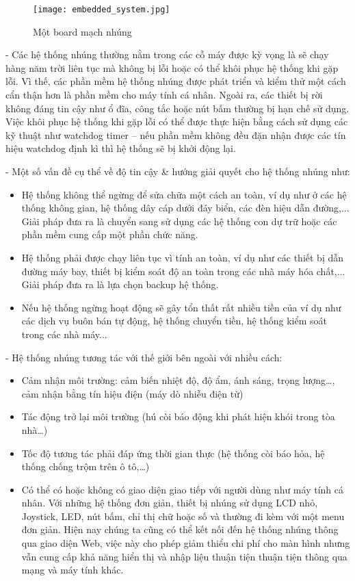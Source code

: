 \begin{figure}[H]
	\centering
	\texttt{[image: embedded\_system.jpg]}
	\caption{Một board mạch nhúng}
\end{figure}

	- Các hệ thống nhúng thường nằm trong các cỗ máy được kỳ vọng là sẽ chạy hàng năm trời liên tục mà không bị lỗi hoặc có thể khôi phục hệ thống khi gặp lỗi. Vì thế, các phần mềm hệ thống nhúng được phát triển và kiểm thử một cách cẩn thận hơn là phần mềm cho máy tính cá nhân. Ngoài ra, các thiết bị rời không đáng tin cậy như ổ đĩa, công tắc hoặc nút bấm thường bị hạn chế sử dụng. Việc khôi phục hệ thống khi gặp lỗi có thể được thực hiện bằng cách sử dụng các kỹ thuật như watchdog timer – nếu phần mềm không đều đặn nhận được các tín hiệu watchdog định kì thì hệ thống sẽ bị khởi động lại.
	
	- Một số vấn đề cụ thể về độ tin cậy \& hướng giải quyết cho hệ thống nhúng như:
\begin{itemize}[leftmargin=2.2cm]
		\item Hệ thống không thể ngừng để sửa chữa một cách an toàn, ví dụ như ở các hệ thống không gian, hệ thống dây cáp dưới đáy biển, các đèn hiệu dẫn đường,... Giải pháp đưa ra là chuyển sang sử dụng các hệ thống con dự trữ hoặc các phần mềm cung cấp một phần chức năng.
		
		\item Hệ thống phải được chạy liên tục vì tính an toàn, ví dụ như các thiết bị dẫn đường máy bay, thiết bị kiểm soát độ an toàn trong các nhà máy hóa chất,... Giải pháp đưa ra là lựa chọn backup hệ thống.
		
		\item Nếu hệ thống ngừng hoạt động sẽ gây tổn thất rất nhiều tiền của ví dụ như các dịch vụ buôn bán tự động, hệ thống chuyển tiền, hệ thống kiểm soát trong các nhà máy...
\end{itemize}

	- Hệ thống nhúng tương tác với thế giới bên ngoài với nhiều cách:
\begin{itemize}[leftmargin=2.2cm]
	\item Cảm nhận môi trường: cảm biến nhiệt độ, độ ẩm, ánh sáng, trọng lượng…, cảm nhận bằng tín hiệu điện (máy dò nhiễu điện từ)
	
	\item Tác động trở lại môi trường (hú còi báo động khi phát hiện khói trong tòa nhà…)
	
	\item Tốc độ tương tác phải đáp ứng thời gian thực (hệ thống còi báo hỏa, hệ thống chống trộm trên ô tô,…)
	
	\item Có thể có hoặc không có giao diện giao tiếp với người dùng như máy tính cá nhân. Với những hệ thống đơn giản, thiết bị nhúng sử dụng LCD nhỏ, Joystick, LED, nút bấm, chỉ thị chữ hoặc số và thường đi kèm với một menu đơn giản. Hiện nay chúng ta cũng có thể kết nối đến hệ thống nhúng thông qua giao diện Web, việc này cho phép giảm thiểu chi phí cho màn hình nhưng vẫn cung cấp khả năng hiển thị và nhập liệu thuận tiện thuận tiện thông qua mạng và máy tính khác.
\end{itemize}	
	
